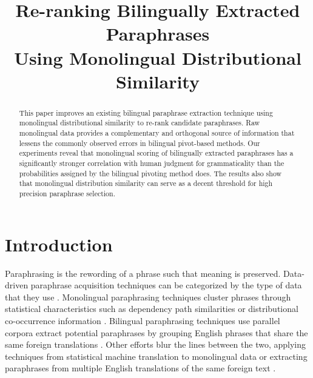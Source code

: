 \documentclass[11pt]{article}
\title{Re-ranking Bilingually Extracted Paraphrases \\ Using Monolingual Distributional Similarity}
\date{}
\newcommand{\mnote}[1]{\marginpar{\raggedleft\footnotesize\itshape#1}}
\begin{document}
\maketitle
\begin{abstract}
This paper improves an existing bilingual paraphrase extraction technique using monolingual distributional similarity to re-rank candidate paraphrases.  Raw monolingual data  provides a complementary and orthogonal source of information that lessens the commonly observed errors in bilingual pivot-based methods. %
Our experiments reveal that monolingual scoring of bilingually extracted paraphrases has a significantly stronger correlation with human judgment for grammaticality than the probabilities assigned by the bilingual pivoting method does. The results also show that monolingual distribution similarity can serve as a decent threshold for high precision paraphrase selection.


\end{abstract} 


\section{Introduction}
Paraphrasing is the rewording of a phrase such that meaning is preserved. Data-driven paraphrase acquisition techniques can be categorized by the type of data that they use \cite{MadnaniDorr10}.  Monolingual paraphrasing techniques cluster phrases through statistical characteristics such as dependency path similarities or distributional co-occurrence information \cite{Lin01discoveryof,PascaDienes05}.   Bilingual paraphrasing techniques use parallel corpora extract potential paraphrases by grouping English phrases that share the same foreign translations \cite{BannardCallisonBurch05}.  Other efforts blur the lines between the two, applying techniques from statistical machine translation to monolingual data or extracting paraphrases from multiple English translations of the same foreign text \cite{Barzilay2001,PangEtAl03,QuirkDolanBrockett04}.
\end{document}
